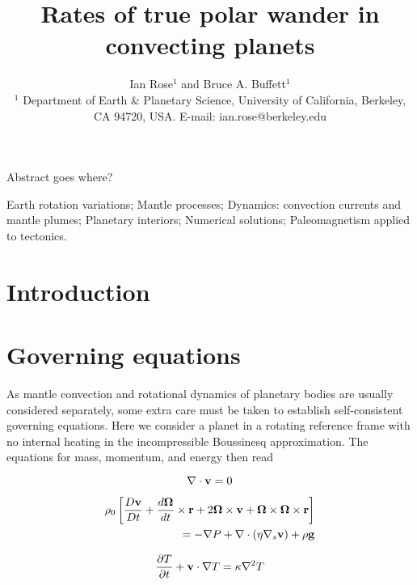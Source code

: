 \documentclass{gji}
\title[TPW Rates]
  {Rates of true polar wander in convecting planets}
\author[I. Rose and B. Buffett]
  {Ian Rose$^1$ and Bruce A. Buffett$^1$ \\
  $^1$ Department of Earth \& Planetary Science, University of California, Berkeley, CA 94720, USA.  E-mail: ian.rose@berkeley.edu
  }
\date{}
\begin{document}
\label{firstpage}

\maketitle

\begin{summary}
Abstract goes where?
\end{summary}

\begin{keywords}
Earth rotation variations; Mantle processes; Dynamics: convection currents and mantle plumes; Planetary interiors; Numerical solutions; Paleomagnetism applied to tectonics.
\end{keywords}

\section{Introduction}


\section{Governing equations}

As mantle convection and rotational dynamics of planetary bodies are usually considered separately, some extra care must be taken to establish self-consistent governing equations.  
Here we consider a planet in a rotating reference frame with no internal heating in the incompressible Boussinesq approximation.  The equations for mass, momentum, and energy then read

\begin{equation}
\nabla \cdot {\bf v} = 0
\label{conserve_mass}
\end{equation}

\begin{equation}
\begin{aligned}
 \rho_0 \left[ \frac{D \bf v}{D t} + \frac{d \bf \Omega}{dt} \times {\bf r} +  2 {\bf \Omega} \times {\bf v} + {\bf \Omega \times \Omega \times r} \right] \\ = - \nabla P + \nabla \cdot \left( \eta \nabla_s {\bf v} \right) + \rho {\bf g}
\label{navier_stokes}
\end{aligned}
\end{equation}

\begin{equation}
\frac{\partial T}{\partial t} + {\bf v} \cdot \nabla T = \kappa \nabla^2 T
\label{energy}
\end{equation}
\end{document}
